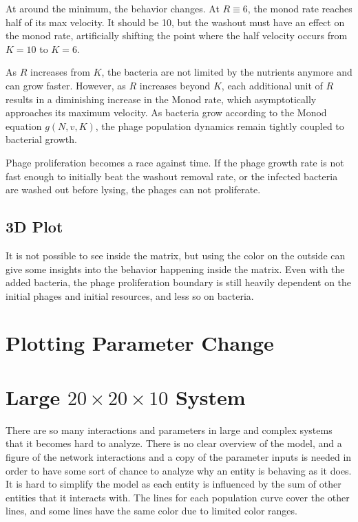 At around the minimum, the behavior changes. 
At $R\equiv 6$, the monod rate reaches half of its max velocity. 
It should be 10, but the washout must have an effect on the monod rate, artificially shifting the point where the half velocity occurs from $K=10$ to $K=6$. 

As $R$ increases from $K$, the bacteria are not limited by the nutrients anymore and can grow faster. 
However, as $R$ increases beyond $K$, each additional unit of $R$ results in a diminishing increase in the Monod rate, which asymptotically approaches its maximum velocity. 
As bacteria grow according to the Monod equation $g(N, v, K)$, the phage population dynamics remain tightly coupled to bacterial growth. 

Phage proliferation becomes a race against time. 
If the phage growth rate is not fast enough to initially beat the washout removal rate, or the infected bacteria are washed out before lysing, the phages can not proliferate. 

\subsection{3D Plot}
It is not possible to see inside the matrix, but using the color on the outside can give some insights into the behavior happening inside the matrix. 
Even with the added bacteria, the phage proliferation boundary is still heavily dependent on the initial phages and initial resources, and less so on bacteria. 

\section{Plotting Parameter Change}

\section{Large $20\times20\times10$ System}
There are so many interactions and parameters in large and complex systems that it becomes hard to analyze. 
There is no clear overview of the model, and a figure of the network interactions and a copy of the parameter inputs is needed in order to have some sort of chance to analyze why an entity is behaving as it does. 
It is hard to simplify the model as each entity is influenced by the sum of other entities that it interacts with. 
The lines for each population curve cover the other lines, and some lines have the same color due to limited color ranges. 

